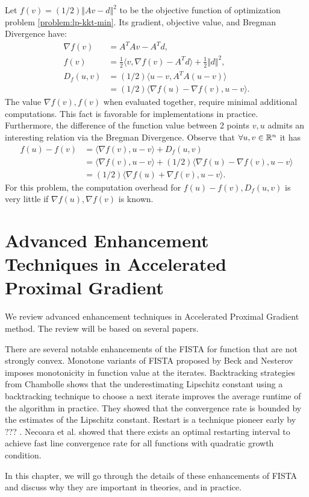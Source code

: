 \documentclass[12pt]{report}
\begin{document}
            Let $f(v) = (1/2)\Vert Av - d\Vert^2$ to be the objective function of optimization problem \eqref{problem:lp-kkt-min}. 
            Its gradient, objective value, and Bregman Divergence have: 
            \begin{align*}
                \nabla f(v) &= A^TAv - A^Td, 
                \\
                f(v) &= 
                \frac{1}{2}\langle v, \nabla f(v) - A^Td\rangle + \frac{1}{2}\Vert d\Vert^2, 
                \\
                D_f(u, v) &= (1/2)\langle u - v, A^TA (u - v)\rangle
                \\
                &= (1/2)\langle \nabla f(u) - \nabla f(v), u - v\rangle. 
            \end{align*}
            The value $\nabla f(v), f(v)$ when evaluated together, require minimal additional computations. 
            This fact is favorable for implementations in practice. 
            Furthermore, the difference of the function value between 2 points $v, u$ admits an interesting relation via the Bregman Divergence. 
            Observe that $\forall u, v \in \mathbb R^n$ it has 
            \begin{align*}
                f(u) - f(v) &= \langle \nabla f(v), u - v \rangle + D_f(u, v)
                \\
                &= \langle \nabla f(v), u - v \rangle + (1/2)\langle \nabla f(u) - \nabla f(v), u - v\rangle
                \\
                &= (1/2)\langle \nabla f(u) + \nabla f(v), u - v\rangle. 
            \end{align*}
            For this problem, the computation overhead for $f(u) - f(v), D_f(u, v)$ is very little if $\nabla f(u), \nabla f(v)$ is known. 

\chapter{Advanced Enhancement Techniques in Accelerated Proximal Gradient}
    We review advanced enhancement techniques in Accelerated Proximal Gradient method. 
    The review will be based on several papers. 
    \par
    There are several notable enhancements of the FISTA for function that are not strongly convex. 
    Monotone variants of FISTA proposed by Beck \todo{[?]} and Nesterov \todo{[?]} imposes monotonicity in function value at the iterates.  
    Backtracking strategies from Chambolle \todo{[?]} shows that the underestimating Lipschitz constant using a backtracking technique to choose a next iterate improves the average runtime of the algorithm in practice. 
    They showed that the convergence rate is bounded by the estimates of the Lipschitz constant. 
    Restart is a technique pioneer early by ??? \todo{[?]}.
    Necoara et al. \cite{necoara_linear_2019} showed that there exists an optimal restarting interval to achieve fast line convergence rate for all functions with quadratic growth condition. 
    \par
    In this chapter, we will go through the details of these enhancements of FISTA and discuss why they are important in theories, and in practice. 
    
\end{document}
